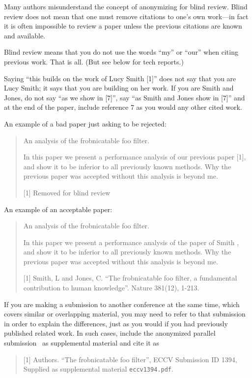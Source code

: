 \documentclass[runningheads]{llncs}
\begin{document}
Many authors misunderstand the concept of anonymizing for blind review.
Blind review does not mean that one must remove citations to one's own work---in fact it is often impossible to review a paper unless the previous citations are known and available.

Blind review means that you do not use the words ``my'' or ``our'' when citing previous work.
That is all.
(But see below for tech reports.)

Saying ``this builds on the work of Lucy Smith [1]'' does not say that you are Lucy Smith;
it says that you are building on her work.
If you are Smith and Jones, do not say ``as we show in [7]'', say ``as Smith and Jones show in [7]'' and at the end of the paper, include reference 7 as you would any other cited work.

An example of a bad paper just asking to be rejected:
\begin{quote}
  \begin{center}
      An analysis of the frobnicatable foo filter.
  \end{center}

   In this paper we present a performance analysis of our previous paper [1], and show it to be inferior to all previously known methods.
   Why the previous paper was accepted without this analysis is beyond me.

   [1] Removed for blind review
\end{quote}

An example of an acceptable paper:
\begin{quote}
  \begin{center}
     An analysis of the frobnicatable foo filter.
  \end{center}

   In this paper we present a performance analysis of the  paper of Smith \etal [1], and show it to be inferior to all previously known methods.
   Why the previous paper was accepted without this analysis is beyond me.

   [1] Smith, L and Jones, C. ``The frobnicatable foo filter, a fundamental contribution to human knowledge''. Nature 381(12), 1-213.
\end{quote}

If you are making a submission to another conference at the same time, which covers similar or overlapping material, you may need to refer to that submission in order to explain the differences, just as you would if you had previously published related work.
In such cases, include the anonymized parallel submission~\cite{Authors14} as supplemental material and cite it as
\begin{quote}
  [1] Authors. ``The frobnicatable foo filter'', ECCV \ECCVyear Submission ID 1394, Supplied as supplemental material {\tt eccv1394.pdf}.
\end{quote}
\end{document}
